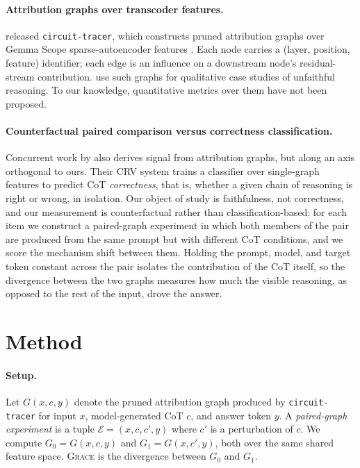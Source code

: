 \documentclass{article}
\newcommand{\GRACE}{\textsc{Grace}}
\begin{document}
\paragraph{Attribution graphs over transcoder features.}
\citet{hanna2025} released \texttt{circuit-tracer}, which constructs
pruned attribution graphs over Gemma Scope sparse-autoencoder features
\citep{lieberum2024}. Each node carries a (layer, position, feature)
identifier; each edge is an influence on a downstream node's
residual-stream contribution. \citet{lindsey2025bio} use such graphs
for qualitative case studies of unfaithful reasoning. To our knowledge,
quantitative metrics over them have not been proposed.

\paragraph{Counterfactual paired comparison versus correctness
classification.}
Concurrent work by \citet{zhao2025crv} also derives signal from
attribution graphs, but along an axis orthogonal to ours. Their CRV
system trains a classifier over single-graph features to predict CoT
\emph{correctness}, that is, whether a given chain of reasoning is
right or wrong, in isolation. Our object of study is faithfulness, not
correctness, and our measurement is counterfactual rather than
classification-based: for each item we construct a paired-graph
experiment in which both members of the pair are produced from the same
prompt but with different CoT conditions, and we score the mechanism
shift between them. Holding the prompt, model, and target token
constant across the pair isolates the contribution of the CoT itself,
so the divergence between the two graphs measures how much the visible
reasoning, as opposed to the rest of the input, drove the answer.

\section{Method}
\label{sec:method}

\paragraph{Setup.}
Let $G(x, c, y)$ denote the pruned attribution graph produced by
\texttt{circuit-tracer} for input $x$, model-generated CoT $c$, and
answer token $y$. A \emph{paired-graph experiment} is a tuple
$\mathcal{E} = (x, c, c', y)$ where $c'$ is a perturbation of $c$. We
compute $G_0 = G(x, c, y)$ and $G_1 = G(x, c', y)$, both over the same
shared feature space. \GRACE{} is the divergence between $G_0$ and
$G_1$.
\end{document}
